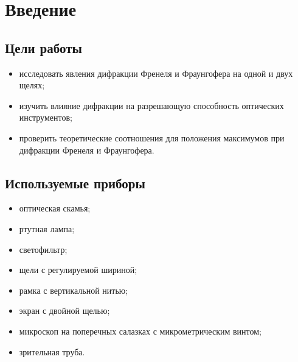 \section{Введение}
\subsection{Цели работы} 
\begin{itemize}
    \item исследовать явления дифракции Френеля и Фраунгофера на одной и двух щелях;
    \item изучить влияние дифракции на разрешающую способность оптических инструментов;
    \item проверить теоретические соотношения для положения максимумов при дифракции Френеля и Фраунгофера.
\end{itemize}

\subsection{Используемые приборы}
\begin{itemize}
    \item оптическая скамья;
    \item ртутная лампа;
    \item светофильтр;
    \item щели с регулируемой шириной;
    \item рамка с вертикальной нитью;
    \item экран с двойной щелью;
    \item микроскоп на поперечных салазках с микрометрическим винтом;
    \item зрительная труба.
\end{itemize}




